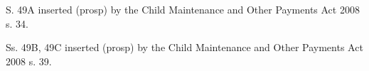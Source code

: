 \documentclass[12pt,a4paper]{article}
\begin{document}
{%
%
%
%
%
%
%
%
%
%
%

S. 49A inserted (prosp) by the Child Maintenance and Other Payments Act 2008 s. 34.

\medskip

Ss. 49B, 49C inserted (prosp) by the Child Maintenance and Other Payments Act 2008 s. 39.
}
\end{document}
